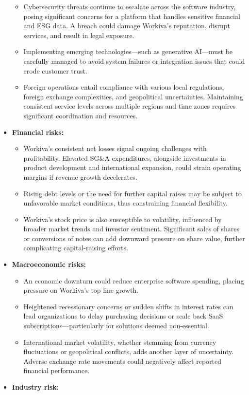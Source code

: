 \documentclass[
  10pt,
  a4paper,
]{article}
\providecommand{\tightlist}{%
  \setlength{\itemsep}{0pt}\setlength{\parskip}{0pt}}\usepackage{longtable,booktabs,array}
\begin{document}
\begin{itemize}
  \begin{itemize}
  \tightlist
  \item
    Cybersecurity threats continue to escalate across the software
    industry, posing significant concerns for a platform that handles
    sensitive financial and ESG data. A breach could damage Workiva's
    reputation, disrupt services, and result in legal exposure.
  \item
    Implementing emerging technologies---such as generative AI---must be
    carefully managed to avoid system failures or integration issues
    that could erode customer trust.
  \item
    Foreign operations entail compliance with various local regulations,
    foreign exchange complexities, and geopolitical uncertainties.
    Maintaining consistent service levels across multiple regions and
    time zones requires significant coordination and resources.
  \end{itemize}
\item
  \textbf{Financial risks:}

  \begin{itemize}
  \tightlist
  \item
    Workiva's consistent net losses signal ongoing challenges with
    profitability. Elevated SG\&A expenditures, alongside investments in
    product development and international expansion, could strain
    operating margins if revenue growth decelerates.
  \item
    Rising debt levels or the need for further capital raises may be
    subject to unfavorable market conditions, thus constraining
    financial flexibility.
  \item
    Workiva's stock price is also susceptible to volatility, influenced
    by broader market trends and investor sentiment. Significant sales
    of shares or conversions of notes can add downward pressure on share
    value, further complicating capital-raising efforts.
  \end{itemize}
\item
  \textbf{Macroeconomic risks:}

  \begin{itemize}
  \tightlist
  \item
    An economic downturn could reduce enterprise software spending,
    placing pressure on Workiva's top-line growth.
  \item
    Heightened recessionary concerns or sudden shifts in interest rates
    can lead organizations to delay purchasing decisions or scale back
    SaaS subscriptions---particularly for solutions deemed
    non-essential.
  \item
    International market volatility, whether stemming from currency
    fluctuations or geopolitical conflicts, adds another layer of
    uncertainty. Adverse exchange rate movements could negatively affect
    reported financial performance.
  \end{itemize}
\item
  \textbf{Industry risk:}


\end{itemize}
\end{document}
